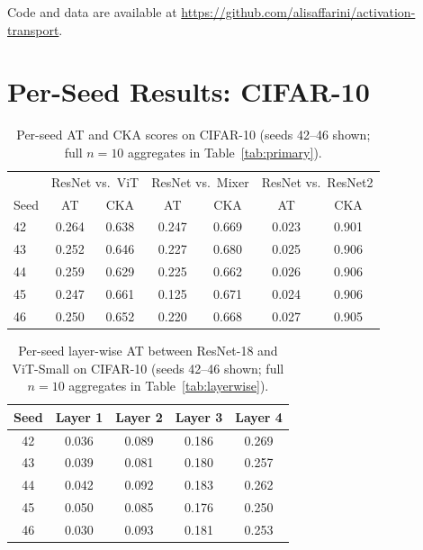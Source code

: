 \documentclass{article}
\begin{document}
Code and data are available at \url{https://github.com/alisaffarini/activation-transport}.




\clearpage
\appendix
\section{Per-Seed Results: CIFAR-10}
\label{app:seeds}

\begin{table}[t]
\caption{Per-seed AT and CKA scores on CIFAR-10 (seeds 42--46 shown; full $n{=}10$ aggregates in Table~\ref{tab:primary}).}
\label{tab:per_seed_c10}
\centering
\small
\begin{tabular}{@{}lcccccc@{}}
\toprule
 & \multicolumn{2}{c}{ResNet vs.\ ViT} & \multicolumn{2}{c}{ResNet vs.\ Mixer} & \multicolumn{2}{c}{ResNet vs.\ ResNet2} \\
Seed & AT & CKA & AT & CKA & AT & CKA \\
\midrule
42 & 0.264 & 0.638 & 0.247 & 0.669 & 0.023 & 0.901 \\
43 & 0.252 & 0.646 & 0.227 & 0.680 & 0.025 & 0.906 \\
44 & 0.259 & 0.629 & 0.225 & 0.662 & 0.026 & 0.906 \\
45 & 0.247 & 0.661 & 0.125 & 0.671 & 0.024 & 0.906 \\
46 & 0.250 & 0.652 & 0.220 & 0.668 & 0.027 & 0.905 \\
\bottomrule
\end{tabular}
\end{table}

\begin{table}[t]
\caption{Per-seed layer-wise AT between ResNet-18 and ViT-Small on CIFAR-10 (seeds 42--46 shown; full $n{=}10$ aggregates in Table~\ref{tab:layerwise}).}
\label{tab:per_seed_layer}
\centering
\small
\begin{tabular}{@{}ccccc@{}}
\toprule
Seed & Layer 1 & Layer 2 & Layer 3 & Layer 4 \\
\midrule
42 & 0.036 & 0.089 & 0.186 & 0.269 \\
43 & 0.039 & 0.081 & 0.180 & 0.257 \\
44 & 0.042 & 0.092 & 0.183 & 0.262 \\
45 & 0.050 & 0.085 & 0.176 & 0.250 \\
46 & 0.030 & 0.093 & 0.181 & 0.253 \\
\bottomrule
\end{tabular}
\end{table}
\end{document}
